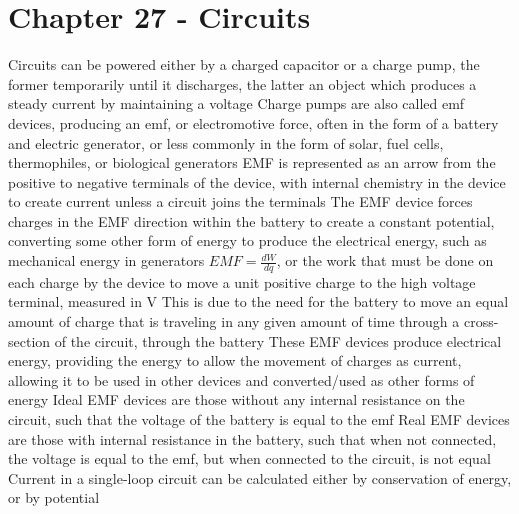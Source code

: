 \documentclass[11 pt, twoside]{article}
\newenvironment{outline*}
{
	\begin{outline}[enumerate]
	}
	{\end{outline}
}
\begin{document}
\section{Chapter 27 - Circuits}
\begin{outline*}
\1 Circuits can be powered either by a charged capacitor or a charge pump, the former temporarily until it discharges, the latter an object which produces a steady current by maintaining a voltage
\2 Charge pumps are also called emf devices, producing an emf, or electromotive force, often in the form of a battery and electric generator, or less commonly in the form of solar, fuel cells, thermophiles, or biological generators
\2 EMF is represented as an arrow from the positive to negative terminals of the device, with internal chemistry in the device to create current unless a circuit joins the terminals
\2 The EMF device forces charges in the EMF direction within the battery to create a constant potential, converting some other form of energy to produce the electrical energy, such as mechanical energy in generators
\2 $EMF = \frac{dW}{dq}$, or the work that must be done on each charge by the device to move a unit positive charge to the high voltage terminal, measured in V
\3 This is due to the need for the battery to move an equal amount of charge that is traveling in any given amount of time through a cross-section of the circuit, through the battery
\2 These EMF devices produce electrical energy, providing the energy to allow the movement of charges as current, allowing it to be used in other devices and converted/used as other forms of energy
\1 Ideal EMF devices are those without any internal resistance on the circuit, such that the voltage of the battery is equal to the emf
\2 Real EMF devices are those with internal resistance in the battery, such that when not connected, the voltage is equal to the emf, but when connected to the circuit, is not equal
\1 Current in a single-loop circuit can be calculated either by conservation of energy, or by potential
\2 
\end{outline*}
\end{document}
